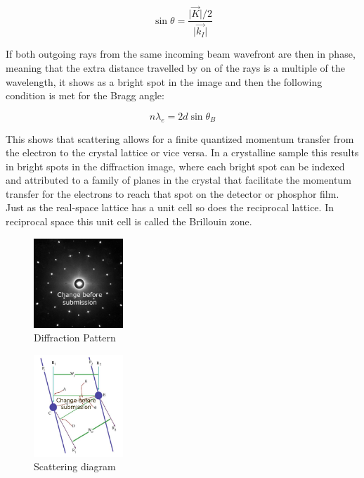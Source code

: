 \begin{equation}
    \sin{\theta}=\frac{\vert \vec{K}\vert / 2}{\vert \vec{k_I}\vert}
    \label{eq:bragg_angle}
\end{equation}

If both outgoing rays from the same incoming beam wavefront are then in phase, meaning that the extra distance travelled by on of the rays is a multiple of the wavelength, it shows as a bright spot in the image and then the following condition is met for the Bragg angle:

\begin{equation}
    n \lambda_e = 2 d \sin{\theta_B}
    \label{eq:bragg_angle_ser}
\end{equation}

This shows that scattering allows for a finite quantized momentum transfer from the electron to the crystal lattice or vice versa. In a crystalline sample this results in bright spots in the diffraction image, where each bright spot can be indexed and attributed to a family of planes in the crystal that facilitate the momentum transfer for the electrons to reach that spot on the detector or phosphor film.
Just as the real-space lattice has a unit cell so does the reciprocal lattice. In reciprocal space this unit cell is called the Brillouin zone.

\begin{figure}
    \centering
    \includegraphics[width=0.3\textwidth, keepaspectratio]{resources/Figures/dp.png}
    \caption{Diffraction Pattern}
    \label{fig:diffraction_pattern}
\end{figure}

\begin{figure}
    \centering
    \includegraphics[width=0.3\textwidth, keepaspectratio]{resources/Figures/scattering.png}
    \caption{Scattering diagram}
    \label{fig:scatt_angle}
\end{figure}

